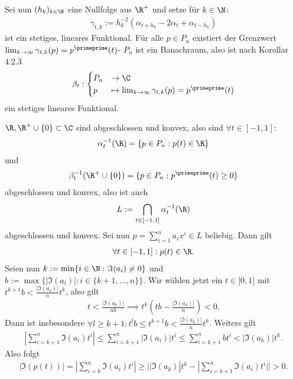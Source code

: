 \begin{solution}
\begin{itemize}
  Sei nun $(h_k)_{k \in \N}$ eine Nullfolge aus $\R^+$ und setze für $k \in \N$:
  \begin{align*}
    \gamma_{t,k} := h_k^{-2}(\alpha_{t + h_k} - 2\alpha_t + \alpha_{t - h_k})
  \end{align*}
  ist ein stetiges, lineares Funktional.
  Für alle $p \in P_n$ existiert der Grenzwert $\lim_{k \to \infty}\gamma_{t,k}(p) = p^{\primeprime}(t)$-
  $P_n$ ist ein Banachraum, also ist nach Korollar 4.2.3
  \begin{align*}
    \beta_t: \begin{cases}
      P_n &\to \C \\
      p &\mapsto \lim_{k \to \infty}\gamma_{t,k}(p) = p^{\primeprime}(t)
    \end{cases}
  \end{align*}
  ein stetiges lineares Funktional.
\end{itemize}
$\R, \R^+ \cup \{0\} \subset \C$ sind abgeschlossen und konvex, also sind $\forall t \in [-1,1]$:
\begin{align*}
  \alpha_t^{-1}(\R) = \{p \in P_n: p(t) \in \R\}
\end{align*}
und
\begin{align*}
  \beta_t^{-1}(\R^+ \cup \{0\}) = \{p \in P_n: p^{\primeprime}(t) \geq 0\}
\end{align*}
abgeschlossen und konvex, also ist auch
\begin{align*}
  L := \bigcap_{t \in [-1,1]}\alpha_t^{-1}(\R)
\end{align*}
abgeschlossen und konvex. Sei nun $p = \sum_{i = 1}^n a_i x^i \in L$ beliebig.
Dann gilt
\begin{align*}
  \forall t \in [-1,1]: p(t) \in \R.
\end{align*}
Seien nun $k := \min \{ i \in \N: \Im(a_i) \neq 0\}$
und $b := \max\{|\Im(a_i)|: i \in \{k+1,\dots,n\}\}$.
Wir wählen jetzt ein $t \in ]0,1]$ mit $t^{k+1}b < \frac{|\Im(a_k)|}{n}t^k$,
also gilt
\begin{align*}
  t < \frac{|\Im(a_k)|}{nb} \implies t^k(tb - \frac{|\Im(a_k)|}{n}) < 0.
\end{align*}
Dann ist insbesondere $\forall l \geq k + 1: t^lb \leq t^{k+1}b < \frac{|\Im(a_k)|}{n}t^k$.
Weiters gilt
\begin{align*}
  |\sum_{i = k + 1}^n \Im(a_i)t^i| \leq \sum_{i = k + 1}^n|\Im(a_i)|t^i
  \leq \sum_{i = k + 1}^n b t^i < |\Im(a_k)|t^k.
\end{align*}
Also folgt
\begin{align*}
  |\Im(p(t))| = |\sum_{i = k}^n \Im(a_i)t^i| \geq | |\Im(a_k)|t^k - |\sum_{i = k + 1}^n \Im(a_i)t^i|| > 0.

\end{align*}
\end{solution}
